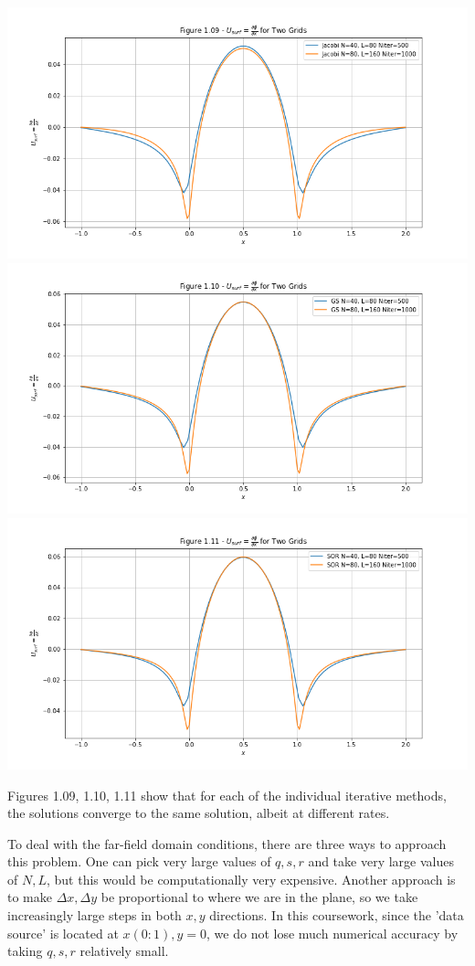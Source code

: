 \documentclass[12pt]{article}
\begin{document}
    \includegraphics[width=\textwidth]{fig1.09}
    \includegraphics[width=\textwidth]{fig1.10}
    \includegraphics[width=\textwidth]{fig1.11}

    Figures 1.09, 1.10, 1.11 show that for each of the individual iterative methods, the solutions converge to the same solution, albeit at different rates.

    To deal with the far-field domain conditions, there are three ways to approach this problem. One can pick very large values of $q, s, r$ and take very large values of $N, L$, but this would be computationally very expensive. Another approach is to make $\Delta x, \Delta y$ be proportional to where we are in the plane, so we take increasingly large steps in both $x, y$ directions. In this coursework, since the 'data source' is located at $x(0:1), y=0$, we do not lose much numerical accuracy by taking $q, s, r$ relatively small.
\end{document}
